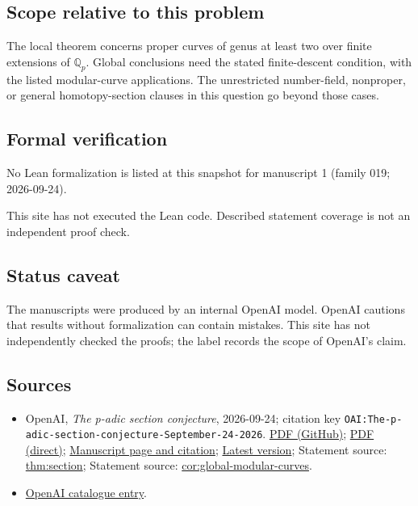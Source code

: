 \documentclass[11pt]{article}
\begin{document}
\subsection{Scope relative to this problem}
The local theorem concerns proper curves of genus at least two over finite extensions of $\mathbb Q_p$. Global conclusions need the stated finite-descent condition, with the listed modular-curve applications. The unrestricted number-field, nonproper, or general homotopy-section clauses in this question go beyond those cases.

\subsection{Formal verification}
No Lean formalization is listed at this snapshot for manuscript 1 (family 019; 2026-09-24).

This site has not executed the Lean code. Described statement coverage is not an independent proof check.

\subsection{Status caveat}
The manuscripts were produced by an internal OpenAI model. OpenAI cautions that results without formalization can contain mistakes. This site has not independently checked the proofs; the label records the scope of OpenAI's claim.

\subsection{Sources}
\begin{itemize}
\item OpenAI, \emph{The p-adic section conjecture}, 2026-09-24; citation key \texttt{OAI:The-p-adic-section-conjecture-September-24-2026}. \href{https://github.com/openai/math/blob/adc7f1241b42e322a6451854ab7e4b4c146bf78a/preprints/The-p-adic-section-conjecture-September-24-2026/main.pdf}{PDF (GitHub)}; \href{https://github.com/openai/math/raw/adc7f1241b42e322a6451854ab7e4b4c146bf78a/preprints/The-p-adic-section-conjecture-September-24-2026/main.pdf}{PDF (direct)}; \href{https://github.com/openai/math/blob/adc7f1241b42e322a6451854ab7e4b4c146bf78a/preprints/The-p-adic-section-conjecture-September-24-2026/README.md}{Manuscript page and citation}; \href{https://github.com/openai/math/blob/main/preprints/The-p-adic-section-conjecture-September-24-2026/main.pdf}{Latest version}; Statement source: \href{https://github.com/openai/math/blob/adc7f1241b42e322a6451854ab7e4b4c146bf78a/preprints/The-p-adic-section-conjecture-September-24-2026/build/sections/01-introduction.tex\#L31}{thm:section}; Statement source: \href{https://github.com/openai/math/blob/adc7f1241b42e322a6451854ab7e4b4c146bf78a/preprints/The-p-adic-section-conjecture-September-24-2026/build/sections/08-global-sections.tex\#L212}{cor:global-modular-curves}.
\item \href{https://github.com/openai/math/blob/adc7f1241b42e322a6451854ab7e4b4c146bf78a/CONTENTS.md}{OpenAI catalogue entry}.
\end{itemize}
\end{document}
